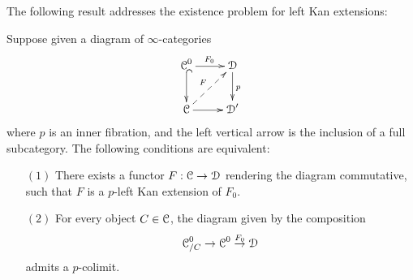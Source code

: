 The following result addresses the existence problem for left Kan extensions:

\begin{lemma}\label{kan2}\label{Kan extension!existence of}
Suppose given a diagram of $\infty$-categories
$$ \xymatrix{ \calC^{0} \ar@{^{(}->}[d] \ar[r]^{F_0} & \calD \ar[d]^{p} \\
\calC \ar[r] \ar@{-->}[ur]^{F} & \calD' }$$
where $p$ is an inner fibration, and the left vertical arrow is the inclusion
of a full subcategory. The following conditions are equivalent:

\begin{itemize}
\item[$(1)$] There exists a functor $F: \operatorname{\mathcal{C}} \rightarrow \operatorname{\mathcal{D}}$ rendering the diagram
commutative, such that $F$ is a $p$-left Kan extension of $F_0$. 

\item[$(2)$] For every object $C \in \operatorname{\mathcal{C}}$, the diagram given by the composition
$$ \operatorname{\mathcal{C}}^{0}_{/C} \rightarrow \operatorname{\mathcal{C}}^{0} \stackrel{F_0}{\rightarrow} \operatorname{\mathcal{D}}$$ admits a $p$-colimit.
\end{itemize}

\end{lemma}


